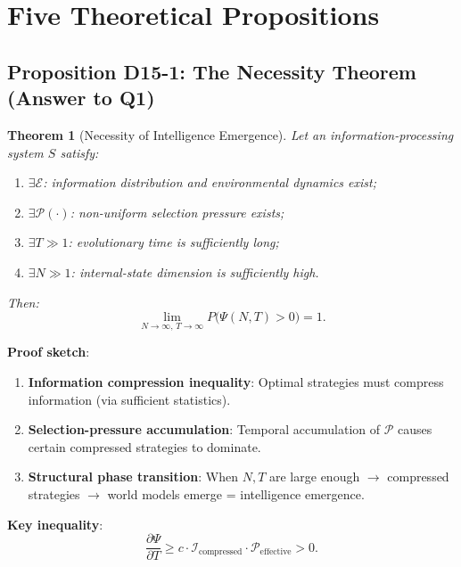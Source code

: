 \documentclass[12pt, a4paper]{article}
\newtheorem{theorem}{Theorem}[section]
\newcommand{\calI}{\mathcal{I}}
\newcommand{\calP}{\mathcal{P}}
\newcommand{\calE}{\mathcal{E}}
\begin{document}
\section{Five Theoretical Propositions}\label{sec:theorems}

\subsection{Proposition D15-1: The Necessity Theorem (Answer to Q1)}\label{sec:theorem1}

\begin{theorem}[Necessity of Intelligence Emergence]\label{thm:necessity}
Let an information-processing system $S$ satisfy:
\begin{enumerate}[label=\arabic*.]
\item $\exists \calE$: information distribution and environmental dynamics exist;
\item $\exists \calP(\cdot)$: non-uniform selection pressure exists;
\item $\exists T \gg 1$: evolutionary time is sufficiently long;
\item $\exists N \gg 1$: internal-state dimension is sufficiently high.
\end{enumerate}
Then:
\begin{equation}
\lim_{N\to\infty,\,T\to\infty} P\bigl(\Psi(N,T) > 0\bigr) = 1.
\end{equation}
\end{theorem}

\noindent\textbf{Proof sketch}:
\begin{enumerate}
\item \textbf{Information compression inequality}: Optimal strategies must compress information (via sufficient statistics).
\item \textbf{Selection-pressure accumulation}: Temporal accumulation of $\calP$ causes certain compressed strategies to dominate.
\item \textbf{Structural phase transition}: When $N, T$ are large enough $\rightarrow$ compressed strategies $\rightarrow$ world models emerge = intelligence emergence.
\end{enumerate}

\noindent\textbf{Key inequality}:
\begin{equation}\label{eq:key-inequality}
\frac{\partial\Psi}{\partial T} \geq c \cdot \calI_{\text{compressed}} \cdot \calP_{\text{effective}} > 0.
\end{equation}
\end{document}
